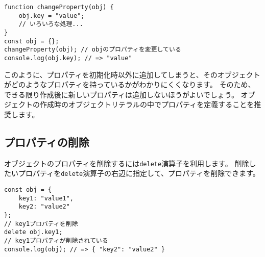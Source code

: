 \begin{lstlisting}
function changeProperty(obj) {
    obj.key = "value";
    // いろいろな処理...
}
const obj = {};
changeProperty(obj); // objのプロパティを変更している
console.log(obj.key); // => "value"
\end{lstlisting}
\vspace{-1mm}
このように、プロパティを初期化時以外に追加してしまうと、そのオブジェクトがどのようなプロパティを持っているかがわかりにくくなります。
そのため、できる限り作成後に新しいプロパティは追加しないほうがよいでしょう。
オブジェクトの作成時のオブジェクトリテラルの中でプロパティを定義することを推奨します。
\vspace{-2mm}
\hypertarget{remove-property}{%
\subsection{プロパティの削除}\label{remove-property}}
\vspace{-1mm}
オブジェクトのプロパティを削除するには\texttt{delete}演算子を利用します。
削除したいプロパティを\texttt{delete}演算子の右辺に指定して、プロパティを削除できます。
\vspace{-1mm}
\begin{lstlisting}
const obj = {
    key1: "value1",
    key2: "value2"
};
// key1プロパティを削除
delete obj.key1;
// key1プロパティが削除されている
console.log(obj); // => { "key2": "value2" }
\end{lstlisting}
\vspace{-1mm}
